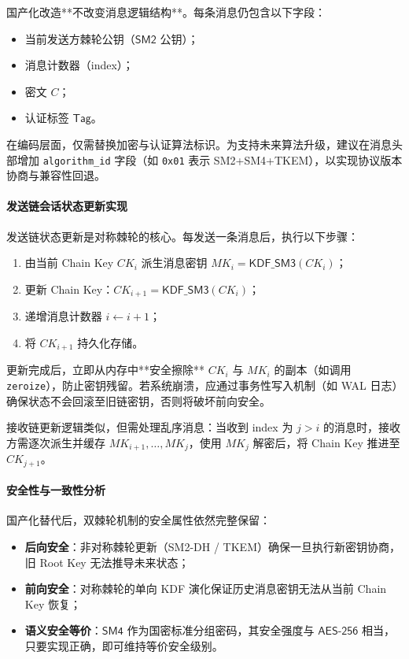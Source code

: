 国产化改造**不改变消息逻辑结构**。每条消息仍包含以下字段：
\begin{itemize}
    \item 当前发送方棘轮公钥（$\mathsf{SM2}$ 公钥）；
    \item 消息计数器（index）；
    \item 密文 $C$；
    \item 认证标签 $\mathsf{Tag}$。
\end{itemize}

在编码层面，仅需替换加密与认证算法标识。为支持未来算法升级，建议在消息头部增加 \texttt{algorithm\_id} 字段（如 \texttt{0x01} 表示 SM2+SM4+TKEM），以实现协议版本协商与兼容性回退。

\paragraph{发送链会话状态更新实现}
\label{sec:chain_update}

发送链状态更新是对称棘轮的核心。每发送一条消息后，执行以下步骤：
\begin{enumerate}
    \item 由当前 Chain Key $CK_i$ 派生消息密钥 $MK_i = \mathsf{KDF\_SM3}(CK_i)$；
    \item 更新 Chain Key：$CK_{i+1} = \mathsf{KDF\_SM3}(CK_i)$；
    \item 递增消息计数器 $i \gets i+1$；
    \item 将 $CK_{i+1}$ 持久化存储。
\end{enumerate}

更新完成后，立即从内存中**安全擦除** $CK_i$ 与 $MK_i$ 的副本（如调用 \texttt{zeroize}），防止密钥残留。若系统崩溃，应通过事务性写入机制（如 WAL 日志）确保状态不会回滚至旧链密钥，否则将破坏前向安全。

接收链更新逻辑类似，但需处理乱序消息：当收到 index 为 $j > i$ 的消息时，接收方需逐次派生并缓存 $MK_{i+1}, \dots, MK_j$，使用 $MK_j$ 解密后，将 Chain Key 推进至 $CK_{j+1}$。

\paragraph{安全性与一致性分析}
\label{sec:security_analysis}

国产化替代后，双棘轮机制的安全属性依然完整保留：
\begin{itemize}
    \item \textbf{后向安全}：非对称棘轮更新（SM2-DH / TKEM）确保一旦执行新密钥协商，旧 Root Key 无法推导未来状态；
    \item \textbf{前向安全}：对称棘轮的单向 KDF 演化保证历史消息密钥无法从当前 Chain Key 恢复；
    \item \textbf{语义安全等价}：$\mathsf{SM4}$ 作为国密标准分组密码，其安全强度与 $\mathsf{AES\text{-}256}$ 相当，只要实现正确，即可维持等价安全级别。
\end{itemize}

